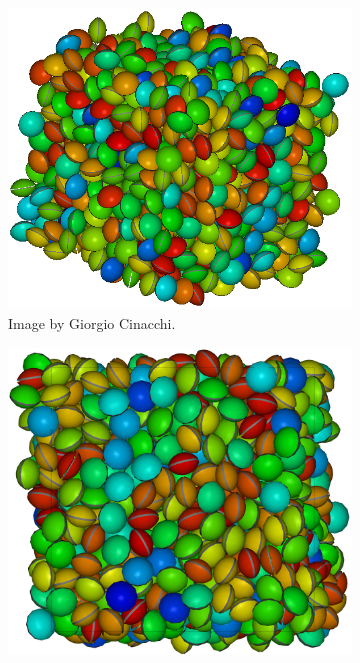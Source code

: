 \begin{figure}
  \begin{center}
    \begin{subfigure}{0.3\textwidth}
      \includegraphics[width=\textwidth]{assets/images/cinacchi}
      \caption{Image by Giorgio Cinacchi.}
      \label{fig:cinacchi_lens_provided}
    \end{subfigure}
    \begin{subfigure}{0.3\textwidth}
      \includegraphics[width=\textwidth]{assets/images/qmga}

\end{subfigure}
\end{center}
\end{figure}
